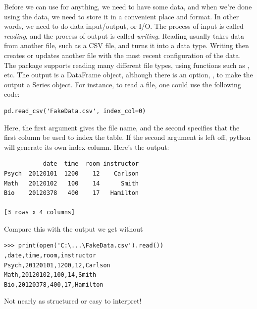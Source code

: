 Before we can use  for anything, we need to have some data, and when we're done using the data, we need to store it in a convenient place and format. In other words, we need to do data input/output, or I/O. The process of input is called \textit{reading}, and the process of output is called \textit{writing}. Reading usually takes data from another file, such as a CSV file, and turns it into a  data type. Writing then creates or updates another file with the most recent configuration of the data.\\
\indent The  package supports reading many different file types, using functions such as , etc. The output is a DataFrame object, although there is an option, , to make the output a Series object. For instance, to read a  file, one could use the following code:
\begin{lstlisting}
pd.read_csv('FakeData.csv', index_col=0)
\end{lstlisting}
Here, the first argument gives the file name, and the second specifies that the first column be used to index the table. If the second argument is left off, python will generate its own index column. Here's the output:

\begin{lstlisting}
           date  time  room instructor
Psych  20120101  1200    12    Carlson
Math   20120102   100    14      Smith
Bio    20120378   400    17   Hamilton

[3 rows x 4 columns]
\end{lstlisting}

Compare this with the output we get without 
\begin{lstlisting}
>>> print(open('C:\...\FakeData.csv').read())
,date,time,room,instructor
Psych,20120101,1200,12,Carlson
Math,20120102,100,14,Smith
Bio,20120378,400,17,Hamilton
\end{lstlisting}

Not nearly as structured or easy to interpret!

